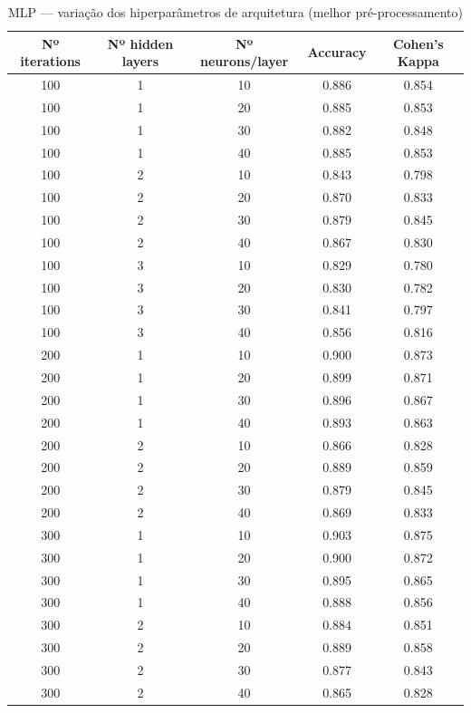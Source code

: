 \documentclass[11pt,a4paper]{article}
\begin{document}
\begin{table}[H]
    \centering
    \caption{MLP --- variação dos hiperparâmetros de arquitetura (melhor pré-processamento)}
    \label{tab:mlp_arquitetura}
    \begin{tabular}{ccccc}
    \toprule
    Nº iterations & Nº hidden layers & Nº neurons/layer & Accuracy & Cohen's Kappa \\
    \midrule
    100 & 1 & 10 & 0.886 & 0.854 \\
    100 & 1 & 20 & 0.885 & 0.853 \\
    100 & 1 & 30 & 0.882 & 0.848 \\
    100 & 1 & 40 & 0.885 & 0.853 \\
    100 & 2 & 10 & 0.843 & 0.798 \\
    100 & 2 & 20 & 0.870 & 0.833 \\
    100 & 2 & 30 & 0.879 & 0.845 \\
    100 & 2 & 40 & 0.867 & 0.830 \\
    100 & 3 & 10 & 0.829 & 0.780 \\
    100 & 3 & 20 & 0.830 & 0.782 \\
    100 & 3 & 30 & 0.841 & 0.797 \\
    100 & 3 & 40 & 0.856 & 0.816 \\
    200 & 1 & 10 & 0.900 & 0.873 \\
    200 & 1 & 20 & 0.899 & 0.871 \\
    200 & 1 & 30 & 0.896 & 0.867 \\
    200 & 1 & 40 & 0.893 & 0.863 \\
    200 & 2 & 10 & 0.866 & 0.828 \\
    200 & 2 & 20 & 0.889 & 0.859 \\
    200 & 2 & 30 & 0.879 & 0.845 \\
    200 & 2 & 40 & 0.869 & 0.833 \\
    300 & 1 & 10 & 0.903 & 0.875 \\
    300 & 1 & 20 & 0.900 & 0.872 \\
    300 & 1 & 30 & 0.895 & 0.865 \\
    300 & 1 & 40 & 0.888 & 0.856 \\
    300 & 2 & 10 & 0.884 & 0.851 \\
    300 & 2 & 20 & 0.889 & 0.858 \\
    300 & 2 & 30 & 0.877 & 0.843 \\
    300 & 2 & 40 & 0.865 & 0.828 \\
    \bottomrule
    \end{tabular}
\end{table}
\end{document}

